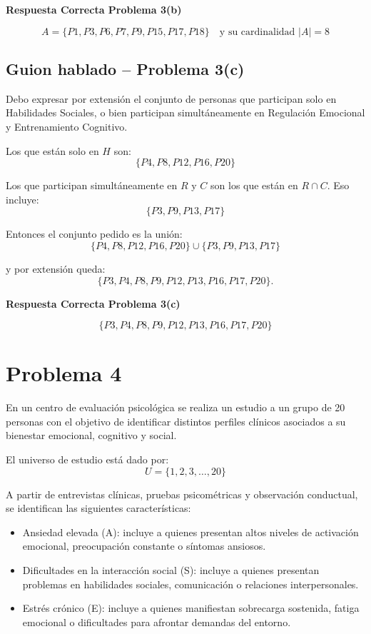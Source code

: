 \documentclass[12pt]{article}
\begin{document}
	\textbf{Respuesta Correcta Problema 3(b)}
	
	\[
	A=\{P1,P3,P6,P7,P9,P15,P17,P18\}\quad \text{y su cardinalidad } |A|=8
	\]
	
	\subsection*{Guion hablado -- Problema 3(c)}
	
	Debo expresar por extensión el conjunto de personas que participan solo en Habilidades Sociales, o bien participan simultáneamente en Regulación Emocional y Entrenamiento Cognitivo.
		
		Los que están solo en \(H\) son:
		\[
		\{P4,P8,P12,P16,P20\}
		\]
		
		Los que participan simultáneamente en \(R\) y \(C\) son los que están en \(R\cap C\). Eso incluye:
		\[
		\{P3,P9,P13,P17\}
		\]
		
		Entonces el conjunto pedido es la unión:
		\[
		\{P4,P8,P12,P16,P20\}\cup \{P3,P9,P13,P17\}
		\]
		
		y por extensión queda:
		\[
		\{P3,P4,P8,P9,P12,P13,P16,P17,P20\}.
		\]
	
	\textbf{Respuesta Correcta Problema 3(c)}
	
	\[
	\{P3,P4,P8,P9,P12,P13,P16,P17,P20\}
	\]
	
	\section*{Problema 4}
	
	En un centro de evaluación psicológica se realiza un estudio a un grupo de 20 personas con el objetivo de identificar distintos perfiles clínicos asociados a su bienestar emocional, cognitivo y social.
	
	El universo de estudio está dado por:
	\[
	U = \{1,2,3,\dots,20\}
	\]
	
	A partir de entrevistas clínicas, pruebas psicométricas y observación conductual, se identifican las siguientes características:
	
	\begin{itemize}
		\item Ansiedad elevada (A): incluye a quienes presentan altos niveles de activación emocional, preocupación constante o síntomas ansiosos.
		\item Dificultades en la interacción social (S): incluye a quienes presentan problemas en habilidades sociales, comunicación o relaciones interpersonales.
		\item Estrés crónico (E): incluye a quienes manifiestan sobrecarga sostenida, fatiga emocional o dificultades para afrontar demandas del entorno.
	\end{itemize}
	
\end{document}
